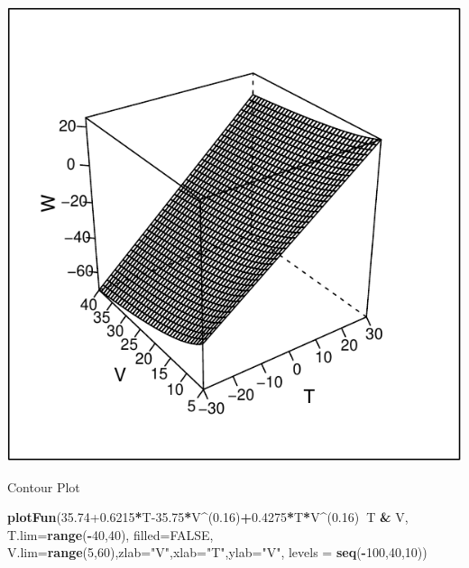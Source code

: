 \documentclass[
]{book}
\newenvironment{Shaded}{\begin{snugshade}}{\end{snugshade}}
\newcommand{\DataTypeTok}[1]{\textcolor[rgb]{0.13,0.29,0.53}{#1}}
\newcommand{\DecValTok}[1]{\textcolor[rgb]{0.00,0.00,0.81}{#1}}
\newcommand{\FloatTok}[1]{\textcolor[rgb]{0.00,0.00,0.81}{#1}}
\newcommand{\KeywordTok}[1]{\textcolor[rgb]{0.13,0.29,0.53}{\textbf{#1}}}
\newcommand{\NormalTok}[1]{#1}
\newcommand{\OperatorTok}[1]{\textcolor[rgb]{0.81,0.36,0.00}{\textbf{#1}}}
\newcommand{\OtherTok}[1]{\textcolor[rgb]{0.56,0.35,0.01}{#1}}
\newcommand{\StringTok}[1]{\textcolor[rgb]{0.31,0.60,0.02}{#1}}
\begin{document}
\includegraphics{_bookdown_files/math135_handbook_files/figure-latex/unnamed-chunk-71-1.pdf}

Contour Plot

\begin{Shaded}
\begin{Highlighting}[]
\KeywordTok{plotFun}\NormalTok{(}\FloatTok{35.74+0.6215}\OperatorTok{*}\NormalTok{T}\FloatTok{-35.75}\OperatorTok{*}\NormalTok{V}\OperatorTok{^}\NormalTok{(}\FloatTok{0.16}\NormalTok{)}\OperatorTok{+}\FloatTok{0.4275}\OperatorTok{*}\NormalTok{T}\OperatorTok{*}\NormalTok{V}\OperatorTok{^}\NormalTok{(}\FloatTok{0.16}\NormalTok{)}\OperatorTok{~}\NormalTok{T }\OperatorTok{&}\StringTok{ }\NormalTok{V, }\DataTypeTok{T.lim=}\KeywordTok{range}\NormalTok{(}\OperatorTok{-}\DecValTok{40}\NormalTok{,}\DecValTok{40}\NormalTok{), }\DataTypeTok{filled=}\OtherTok{FALSE}\NormalTok{,}
\DataTypeTok{V.lim=}\KeywordTok{range}\NormalTok{(}\DecValTok{5}\NormalTok{,}\DecValTok{60}\NormalTok{),}\DataTypeTok{zlab=}\StringTok{"V"}\NormalTok{,}\DataTypeTok{xlab=}\StringTok{"T"}\NormalTok{,}\DataTypeTok{ylab=}\StringTok{"V"}\NormalTok{, }\DataTypeTok{levels =} \KeywordTok{seq}\NormalTok{(}\OperatorTok{-}\DecValTok{100}\NormalTok{,}\DecValTok{40}\NormalTok{,}\DecValTok{10}\NormalTok{))}
\end{Highlighting}
\end{Shaded}
\end{document}
